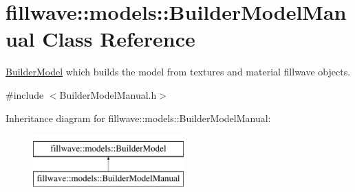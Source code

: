 \hypertarget{classfillwave_1_1models_1_1BuilderModelManual}{}\section{fillwave\+:\+:models\+:\+:Builder\+Model\+Manual Class Reference}
\label{classfillwave_1_1models_1_1BuilderModelManual}


\hyperlink{classfillwave_1_1models_1_1BuilderModel}{Builder\+Model} which builds the model from textures and material fillwave objects.  




{\ttfamily \#include $<$Builder\+Model\+Manual.\+h$>$}

Inheritance diagram for fillwave\+:\+:models\+:\+:Builder\+Model\+Manual\+:\begin{figure}[H]
\begin{center}
\leavevmode
\includegraphics[height=2.000000cm]{classfillwave_1_1models_1_1BuilderModelManual}
\end{center}
\end{figure}
